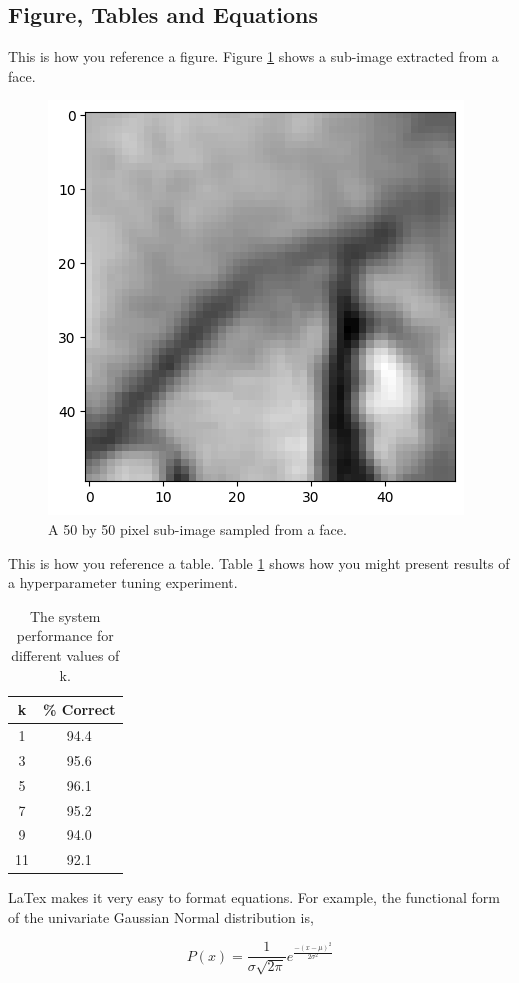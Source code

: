 \documentclass[a4paper]{article}
\begin{document}
\subsection{Figure, Tables and Equations}

This is how you reference a figure. Figure \ref{fig:face} shows a sub-image extracted from a face.

\begin{figure}[t]
    \centering
    \includegraphics[width=0.8\linewidth]{face50_1.png}
    \caption{A 50 by 50 pixel sub-image sampled from a face.}
    \label{fig:face}
  \end{figure}

This is how you reference a table. Table \ref{tab:example} shows how you might present results of a hyperparameter tuning experiment.
\begin{table}[th]
    \caption{The system performance for different values of k.}
    \label{tab:example}
    \centering
    \begin{tabular}{ c|c}
      \toprule
      k & \% Correct\\
      \midrule
       1 & 94.4 \\
       3 & 95.6 \\
       5 & 96.1 \\
       7 & 95.2 \\
       9 & 94.0 \\
       11 & 92.1 \\
      \bottomrule
    \end{tabular}

  \end{table}

  LaTex makes it very easy to format equations. For example, the functional form of the univariate Gaussian Normal distribution is,

  \begin{equation}
P(x) = \frac{1}{\sigma \sqrt {2\pi } }e^{\frac{ - \left( {x - \mu } \right)^2 }{2\sigma^2}}
\label{eq:gaussian}
  \end{equation}





\end{document}
